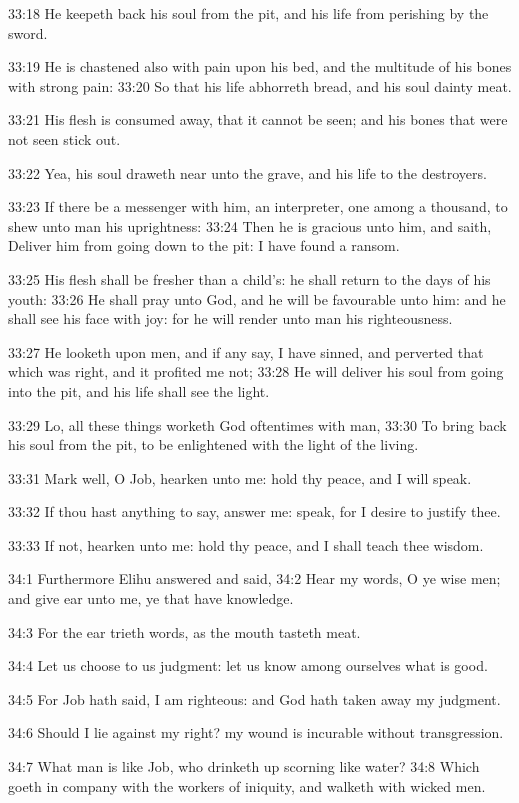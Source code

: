 33:18 He keepeth back his soul from the pit, and his life from
perishing by the sword.

33:19 He is chastened also with pain upon his bed, and the multitude
of his bones with strong pain: 33:20 So that his life abhorreth bread,
and his soul dainty meat.

33:21 His flesh is consumed away, that it cannot be seen; and his
bones that were not seen stick out.

33:22 Yea, his soul draweth near unto the grave, and his life to the
destroyers.

33:23 If there be a messenger with him, an interpreter, one among a
thousand, to shew unto man his uprightness: 33:24 Then he is gracious
unto him, and saith, Deliver him from going down to the pit: I have
found a ransom.

33:25 His flesh shall be fresher than a child's: he shall return to
the days of his youth: 33:26 He shall pray unto God, and he will be
favourable unto him: and he shall see his face with joy: for he will
render unto man his righteousness.

33:27 He looketh upon men, and if any say, I have sinned, and
perverted that which was right, and it profited me not; 33:28 He will
deliver his soul from going into the pit, and his life shall see the
light.

33:29 Lo, all these things worketh God oftentimes with man, 33:30 To
bring back his soul from the pit, to be enlightened with the light of
the living.

33:31 Mark well, O Job, hearken unto me: hold thy peace, and I will
speak.

33:32 If thou hast anything to say, answer me: speak, for I desire to
justify thee.

33:33 If not, hearken unto me: hold thy peace, and I shall teach thee
wisdom.

34:1 Furthermore Elihu answered and said, 34:2 Hear my words, O ye
wise men; and give ear unto me, ye that have knowledge.

34:3 For the ear trieth words, as the mouth tasteth meat.

34:4 Let us choose to us judgment: let us know among ourselves what is
good.

34:5 For Job hath said, I am righteous: and God hath taken away my
judgment.

34:6 Should I lie against my right? my wound is incurable without
transgression.

34:7 What man is like Job, who drinketh up scorning like water?  34:8
Which goeth in company with the workers of iniquity, and walketh with
wicked men.

